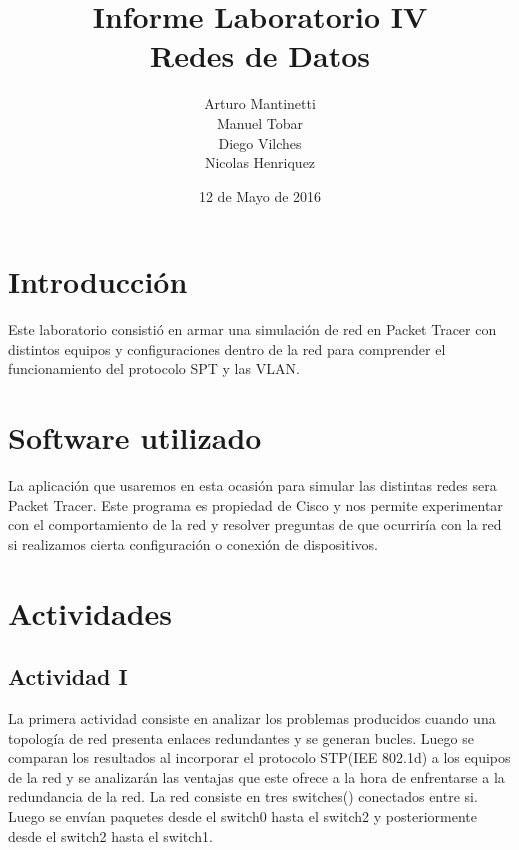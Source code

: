 \documentclass[spanish]{udpreport}
\title{Informe Laboratorio IV \\ Redes de Datos}
\author{Arturo Mantinetti \\ Manuel Tobar \\ Diego Vilches \\ Nicolas Henriquez}
\date{12 de Mayo de 2016}
\begin{document}
\maketitle

\tableofcontents

\chapter{Introducción}

Este laboratorio consistió en armar una simulación de red en Packet Tracer con distintos equipos y configuraciones dentro de la red para comprender el funcionamiento del protocolo SPT y las VLAN.

\chapter{Software utilizado}
La aplicación que usaremos en esta ocasión para simular las distintas redes sera Packet Tracer. Este programa es propiedad de Cisco y nos permite experimentar con el comportamiento de la red y resolver preguntas de que ocurriría con la red si realizamos cierta configuración o conexión de dispositivos.

\chapter{Actividades}

\section{Actividad I}
La primera actividad consiste en analizar los problemas producidos cuando una topología de red presenta enlaces redundantes y se generan bucles. Luego se comparan los resultados al incorporar el protocolo STP(IEE 802.1d) a los equipos de la red y se analizarán las ventajas que este ofrece a la hora de enfrentarse a la redundancia de la red.
La red consiste en tres switches()  conectados entre si. Luego se envían paquetes desde el switch0 hasta el switch2 y posteriormente desde el switch2 hasta el switch1.
\end{document}
